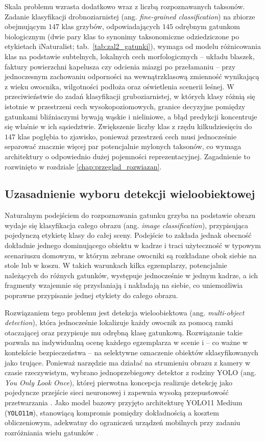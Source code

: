 Skala problemu wzrasta dodatkowo wraz z liczbą rozpoznawanych taksonów. Zadanie klasyfikacji drobnoziarnistej (ang. \textit{fine-grained classification}) na zbiorze obejmującym $147$ klas grzybów, odpowiadających $145$ odrębnym gatunkom biologicznym (dwie pary klas to synonimy taksonomiczne odziedziczone po etykietach iNaturalist; tab.~\ref{tab:zal2_gatunki}), wymaga od modelu różnicowania klas na podstawie subtelnych, lokalnych cech morfologicznych – układu blaszek, faktury powierzchni kapelusza czy odcienia miazgi po przełamaniu – przy jednoczesnym zachowaniu odporności na wewnątrzklasową zmienność wynikającą z wieku owocnika, wilgotności podłoża oraz oświetlenia scenerii leśnej. W przeciwieństwie do zadań klasyfikacji gruboziarnistej, w których klasy różnią się istotnie w przestrzeni cech wysokopoziomowych, granice decyzyjne pomiędzy gatunkami bliźniaczymi bywają wąskie i nieliniowe, a błąd predykcji koncentruje się właśnie w ich sąsiedztwie. Zwiększenie liczby klas z rzędu kilkudziesięciu do $147$ klas pogłębia to zjawisko, ponieważ przestrzeń cech musi jednocześnie separować znacznie więcej par potencjalnie mylonych taksonów, co wymaga architektury o odpowiednio dużej pojemności reprezentacyjnej. Zagadnienie to rozwinięto w rozdziale \ref{chap:przeglad_rozwiazan}.

\subsection{Uzasadnienie wyboru detekcji wieloobiektowej}
Naturalnym podejściem do rozpoznawania gatunku grzyba na podstawie obrazu wydaje się klasyfikacja całego obrazu (ang. \textit{image classification}), przypisująca pojedynczą etykietę klasy do całej sceny. Podejście to zakłada jednak obecność dokładnie jednego dominującego obiektu w kadrze i traci użyteczność w typowym scenariuszu domowym, w którym zebrane owocniki są rozkładane obok siebie na stole lub w koszu. W takich warunkach kilka egzemplarzy, potencjalnie należących do różnych gatunków, występuje jednocześnie w jednym kadrze, a ich fragmenty wzajemnie się przysłaniają i nakładają na siebie, co uniemożliwia poprawne przypisanie jednej etykiety do całego obrazu.

Rozwiązaniem tego problemu jest detekcja wieloobiektowa (ang. \textit{multi-object detection}), która jednocześnie lokalizuje każdy owocnik za pomocą ramki otaczającej oraz przypisuje mu odrębną klasę gatunkową. Rozwiązanie takie pozwala na indywidualną ocenę każdego egzemplarza w scenie i – co ważne w kontekście bezpieczeństwa – na selektywne oznaczenie obiektów sklasyfikowanych jako trujące. Ponieważ narzędzie ma działać na strumieniu obrazu z kamery w czasie rzeczywistym, wybrano jednoprzebiegowy detektor z rodziny YOLO (ang. \textit{You Only Look Once}), której pierwotna koncepcja realizuje detekcję jako pojedyncze przejście sieci neuronowej i zapewnia wysoką przepustowość przetwarzania \cite{redmon2016yolo}. Jako model bazowy przyjęto architekturę YOLO11 Medium (\texttt{YOLO11m}), stanowiącą kompromis pomiędzy dokładnością a kosztem obliczeniowym, adekwatny do ograniczeń urządzeń mobilnych przy zadaniu rozróżniania wielu gatunków \cite{ultralytics2024yolo11}.

